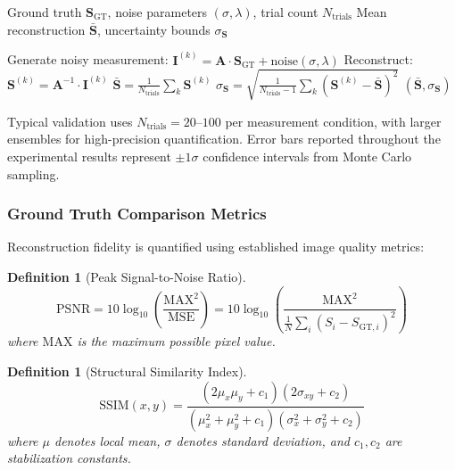 \documentclass[twocolumn,10pt,a4paper]{article}
\newtheorem{definition}[theorem]{Definition}
\begin{document}
\begin{algorithm}[H]
\caption{Monte Carlo Uncertainty Quantification for RPI}
\begin{algorithmic}[1]
\Require Ground truth $\mathbf{S}_{\text{GT}}$, noise parameters $(\sigma, \lambda)$, trial count $N_{\text{trials}}$
\Ensure Mean reconstruction $\bar{\mathbf{S}}$, uncertainty bounds $\sigma_{\mathbf{S}}$

    \State Generate noisy measurement: $\mathbf{I}^{(k)} = \mathbf{A} \cdot \mathbf{S}_{\text{GT}} + \text{noise}(\sigma, \lambda)$
    \State Reconstruct: $\mathbf{S}^{(k)} = \mathbf{A}^{-1} \cdot \mathbf{I}^{(k)}$
\EndFor
\State $\bar{\mathbf{S}} = \frac{1}{N_{\text{trials}}} \sum_k \mathbf{S}^{(k)}$
\State $\sigma_{\mathbf{S}} = \sqrt{\frac{1}{N_{\text{trials}}-1} \sum_k (\mathbf{S}^{(k)} - \bar{\mathbf{S}})^2}$
\State \Return $(\bar{\mathbf{S}}, \sigma_{\mathbf{S}})$
\end{algorithmic}
\end{algorithm}

Typical validation uses $N_{\text{trials}} = 20$--$100$ per measurement condition, with larger ensembles for high-precision quantification. Error bars reported throughout the experimental results represent $\pm 1\sigma$ confidence intervals from Monte Carlo sampling.

\subsubsection{Ground Truth Comparison Metrics}

Reconstruction fidelity is quantified using established image quality metrics:

\begin{definition}[Peak Signal-to-Noise Ratio]
\begin{equation}
\text{PSNR} = 10 \log_{10} \left( \frac{\text{MAX}^2}{\text{MSE}} \right) = 10 \log_{10} \left( \frac{\text{MAX}^2}{\frac{1}{N}\sum_{i}(S_i - S_{\text{GT},i})^2} \right)
\end{equation}
where $\text{MAX}$ is the maximum possible pixel value.
\end{definition}

\begin{definition}[Structural Similarity Index]
\begin{equation}
\text{SSIM}(x, y) = \frac{(2\mu_x \mu_y + c_1)(2\sigma_{xy} + c_2)}{(\mu_x^2 + \mu_y^2 + c_1)(\sigma_x^2 + \sigma_y^2 + c_2)}
\end{equation}
where $\mu$ denotes local mean, $\sigma$ denotes standard deviation, and $c_1, c_2$ are stabilization constants.
\end{definition}
\end{document}
